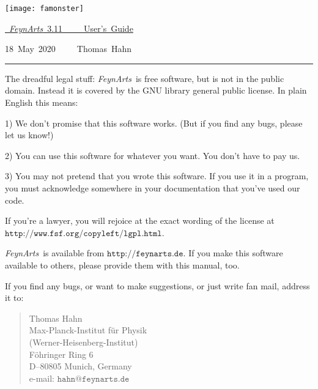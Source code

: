 \documentclass[twoside,12pt]{article}
\def\FA{\textit{FeynArts}}
\def\Code#1{\ensuremath{\texttt{#1}}}
\begin{document}
\thispagestyle{empty}

\vspace*{.2\textheight}

\hfill\texttt{[image: famonster]}

\bigskip\bigskip

\hfill\hbox{\underline{%
\vrule width 0pt height 0pt depth 2ex%
\Huge \FA\ 3.11~~~~~User's Guide}}

\vspace*{1ex}

\hfill\hbox{18 May 2020~~~~~Thomas Hahn}

\clearpage

\vspace*{.5\textheight}
\vfill

\hrule

\medskip

\begin{scriptsize}
The dreadful legal stuff:
\FA\ is free software, but is not in the public domain.
Instead it is covered by the GNU library general public license.
In plain English this means:

1) We don't promise that this software works.   
(But if you find any bugs, please let us know!)

2) You can use this software for whatever you want.
You don't have to pay us.

3) You may not pretend that you wrote this software.
If you use it in a program, you must acknowledge
somewhere in your documentation that you've used  
our code.

If you're a lawyer, you will rejoice at the exact wording of the license 
at \Code{http://www.fsf.org/copyleft/lgpl.html}.

\FA\ is available from \Code{http://feynarts.de}.  If you make this
software available to others, please provide them with this manual, too.

If you find any bugs, or want to make suggestions, or just write fan mail,
address it to:
\vspace*{-2ex}
\begin{quote}
Thomas Hahn \\
Max-Planck-Institut f\"ur Physik \\
(Werner-Heisenberg-Institut) \\
F\"ohringer Ring 6 \\
D--80805 Munich, Germany \\
e-mail: \Code{hahn@feynarts.de}
\end{quote}
\end{scriptsize}
\end{document}
